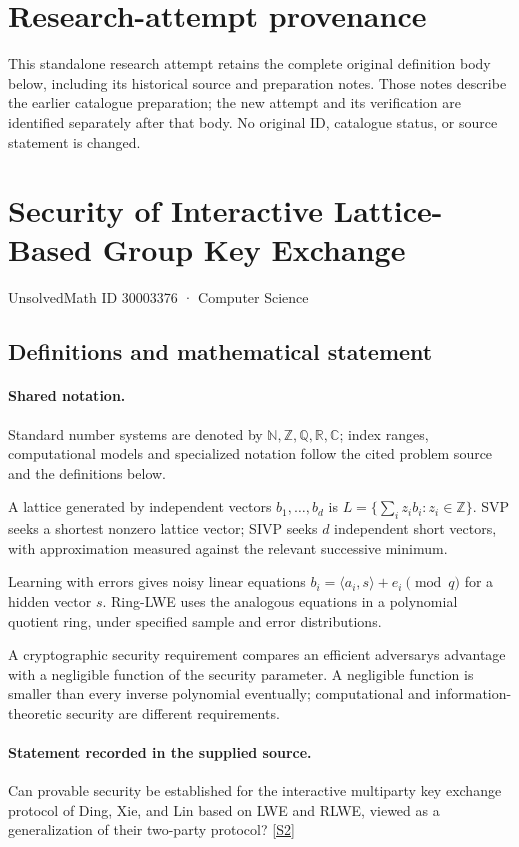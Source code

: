 \documentclass[11pt]{article}
\begin{document}
\section*{Research-attempt provenance}
This standalone research attempt retains the complete original definition body below,
including its historical source and preparation notes. Those notes describe the
earlier catalogue preparation; the new attempt and its verification are identified
separately after that body. No original ID, catalogue status, or source statement is changed.

\section{Security of Interactive Lattice-Based Group Key Exchange}\label{30003376}
{\small UnsolvedMath ID 30003376 · Computer Science}
\subsection{Definitions and mathematical statement}

\paragraph{Shared notation.}Standard number systems are denoted by $\mathbb N,\mathbb Z,\mathbb Q,\mathbb R,\mathbb C$; index ranges, computational models and specialized notation follow the cited problem source and the definitions below.


A lattice generated by independent vectors $b_1,\ldots,b_d$ is $L=\{\sum_i z_i b_i:z_i\in\mathbb Z\}$. SVP seeks a shortest nonzero lattice vector; SIVP seeks $d$ independent short vectors, with approximation measured against the relevant successive minimum.

Learning with errors gives noisy linear equations $b_i=\langle a_i,s\rangle+e_i\pmod q$ for a hidden vector $s$. Ring-LWE uses the analogous equations in a polynomial quotient ring, under specified sample and error distributions.

A cryptographic security requirement compares an efficient adversary\textquotesingle s advantage with a negligible function of the security parameter. A negligible function is smaller than every inverse polynomial eventually; computational and information-theoretic security are different requirements.
\paragraph{Statement recorded in the supplied source.}
Can provable security be established for the interactive multiparty key exchange protocol of Ding, Xie, and Lin based on LWE and RLWE, viewed as a generalization of their two-party protocol? \href{https://doi.org/10.4171/owr/2017/5}{[S2]}
\end{document}

